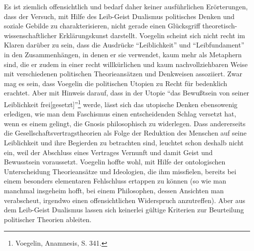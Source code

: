 Es ist ziemlich offensichtlich und bedarf daher keiner ausführlichen
Erörterungen, dass der Versuch, mit Hilfe des Leib-Geist Dualismus politisches
Denken und soziale Gebilde zu charakterisieren, nicht gerade einen Glücksgriff
theoretisch-wissenschaftlicher Erklärungskunst darstellt. Voegelin scheint
sich nicht recht im Klaren darüber zu sein, dass die Ausdrücke
"`Leiblichkeit"' und "`Leibfundament"' in den Zusammenhängen, in denen er sie
verwendet, kaum mehr als Metaphern sind, die er zudem in einer recht
willkürlichen und kaum nachvollziehbaren Weise mit verschiedenen politischen
Theorieansätzen und Denkweisen assoziiert. Zwar mag es sein, dass Voegelin die
politischen Utopien zu Recht für bedenklich erachtet. Aber mit Hinweis darauf,
dass in der Utopie "`das Bewußtsein von seiner Leiblichkeit
frei[gesetzt]"'\footnote{Voegelin, Anamnesis, S. 341.} werde, lässt sich das
utopische Denken ebensowenig erledigen, wie man dem Faschismus einen
entscheidenden Schlag versetzt hat, wenn es einem gelingt, die Gnosis
philosophisch zu widerlegen.  Dass andererseits die
Gesellschaftsvertragstheorien als Folge der Reduktion des Menschen auf seine
Leiblichkeit und ihre Begierden zu betrachten sind, leuchtet schon deshalb
nicht ein, weil der Abschluss eines Vertrages Vernunft und damit Geist und
Bewusstsein voraussetzt. Voegelin hoffte wohl, mit Hilfe der ontologischen
Unterscheidung Theorieansätze und Ideologien, die ihm missfielen, bereits bei
einem besonders elementaren Fehlschluss ertappen zu können (so wie man manchmal
insgeheim hofft, bei einem Philosophen, dessen Ansichten man verabscheut,
irgendwo einen offensichtlichen Widerspruch anzutreffen). Aber aus dem
Leib-Geist Dualismus lassen sich keinerlei gültige Kriterien zur Beurteilung
politischer Theorien ableiten.

